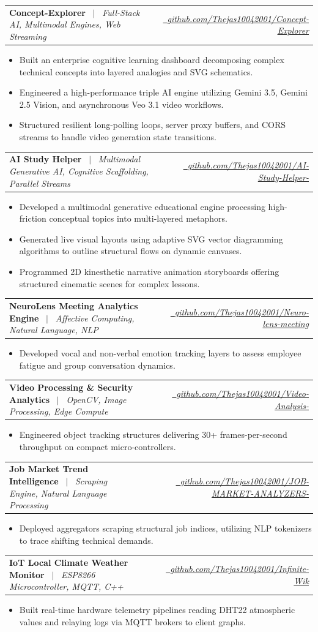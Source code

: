 \documentclass[letterpaper,10pt]{article}
\makeatletter
\newcommand{\resumeBullet}[1]{
  \item\small{
    {#1 \vspace{-1.5pt}}
  }
}
\newcommand{\resumeProjectHeading}[3]{
  \vspace{-1.5pt}\item
    \begin{tabular*}{0.97\textwidth}[t]{l@{\extracolsep{\fill}}r}
      \textbf{#1} \ $|$ \ \small\textit{#2} & \href{https://#3}{\small\color{IconColor}\faGithub\ \color{black}\textit{#3}} \\
    \end{tabular*}\vspace{-5.5pt}
}
\newcommand{\resumeItemListStart}{\begin{itemize}[leftmargin=0.12in, label={$\bullet$}]}
\newcommand{\resumeItemListEnd}{\end{itemize}\vspace{-2pt}}
\makeatother
\begin{document}
  \resumeProjectHeading{Concept-Explorer}{Full-Stack AI, Multimodal Engines, Web Streaming}{github.com/Thejas10042001/Concept-Explorer}
  \resumeItemListStart
    \resumeBullet{Built an enterprise cognitive learning dashboard decomposing complex technical concepts into layered analogies and SVG schematics.}
    \resumeBullet{Engineered a high-performance triple AI engine utilizing Gemini 3.5, Gemini 2.5 Vision, and asynchronous Veo 3.1 video workflows.}
    \resumeBullet{Structured resilient long-polling loops, server proxy buffers, and CORS streams to handle video generation state transitions.}
  \resumeItemListEnd

  \resumeProjectHeading{AI Study Helper}{Multimodal Generative AI, Cognitive Scaffolding, Parallel Streams}{github.com/Thejas10042001/AI-Study-Helper-}
  \resumeItemListStart
    \resumeBullet{Developed a multimodal generative educational engine processing high-friction conceptual topics into multi-layered metaphors.}
    \resumeBullet{Generated live visual layouts using adaptive SVG vector diagramming algorithms to outline structural flows on dynamic canvases.}
    \resumeBullet{Programmed 2D kinesthetic narrative animation storyboards offering structured cinematic scenes for complex lessons.}
  \resumeItemListEnd

  \resumeProjectHeading{NeuroLens Meeting Analytics Engine}{Affective Computing, Natural Language, NLP}{github.com/Thejas10042001/Neuro-lens-meeting}
  \resumeItemListStart
    \resumeBullet{Developed vocal and non-verbal emotion tracking layers to assess employee fatigue and group conversation dynamics.}
  \resumeItemListEnd

  \resumeProjectHeading{Video Processing \& Security Analytics}{OpenCV, Image Processing, Edge Compute}{github.com/Thejas10042001/Video-Analysis-}
  \resumeItemListStart
    \resumeBullet{Engineered object tracking structures delivering 30+ frames-per-second throughput on compact micro-controllers.}
  \resumeItemListEnd

  \resumeProjectHeading{Job Market Trend Intelligence}{Scraping Engine, Natural Language Processing}{github.com/Thejas10042001/JOB-MARKET-ANALYZERS-}
  \resumeItemListStart
    \resumeBullet{Deployed aggregators scraping structural job indices, utilizing NLP tokenizers to trace shifting technical demands.}
  \resumeItemListEnd


  \resumeProjectHeading{IoT Local Climate Weather Monitor}{ESP8266 Microcontroller, MQTT, C++}{github.com/Thejas10042001/Infinite-Wik}
  \resumeItemListStart
    \resumeBullet{Built real-time hardware telemetry pipelines reading DHT22 atmospheric values and relaying logs via MQTT brokers to client graphs.}
  \resumeItemListEnd
\end{document}
